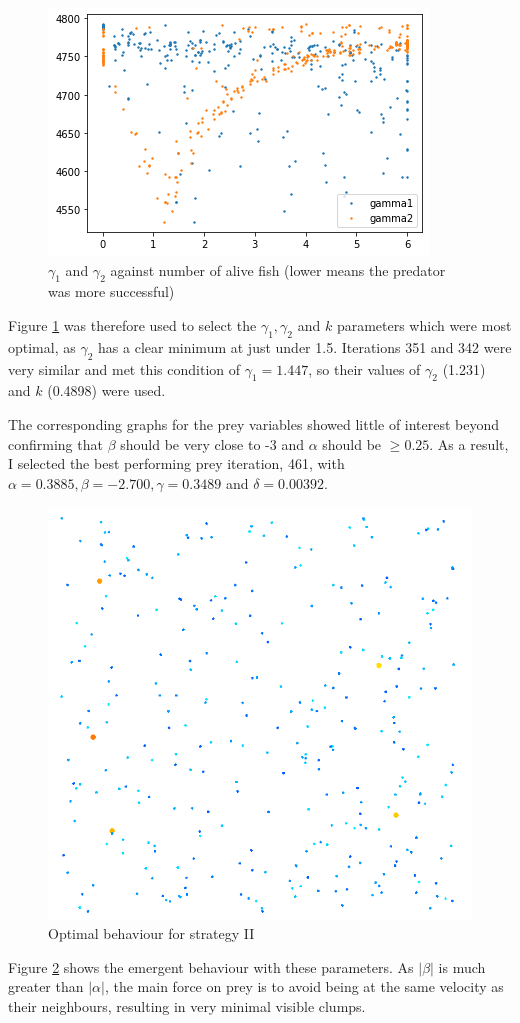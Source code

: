 \begin{figure}
    \centering
    \includegraphics[width=0.5\linewidth]{fig/2_gammas_pred.png}
    \caption{$\gamma_1$ and $\gamma_2$ against number of alive fish (lower means the predator was more successful)}
    \label{fig:2_gammas}
\end{figure}
Figure \ref{fig:2_gammas} was therefore used to select the $\gamma_1, \gamma_2$ and $k$ parameters which were most optimal, as $\gamma_2$ has a clear minimum at just under 1.5. Iterations 351 and 342 were very similar and met this condition of $\gamma_1 = 1.447$, so their values of $\gamma_2$ (1.231) and $k$ (0.4898) were used.\par
The corresponding graphs for the prey variables showed little of interest beyond confirming that $\beta$ should be very close to -3 and $\alpha$ should be $\ge0.25$. As a result, I selected the best performing prey iteration, 461, with $\alpha=0.3885, \beta=-2.700,\gamma=0.3489$ and $\delta=0.00392$.\par
\begin{figure}
    \centering
    \includegraphics[width=0.5\linewidth]{ii.png}
    \caption{Optimal behaviour for strategy II}
    \label{fig:ii}
\end{figure}
Figure \ref{fig:ii} shows the emergent behaviour with these parameters. As $|\beta|$ is much greater than $|\alpha|$, the main force on prey is to avoid being at the same velocity as their neighbours, resulting in very minimal visible clumps. %

